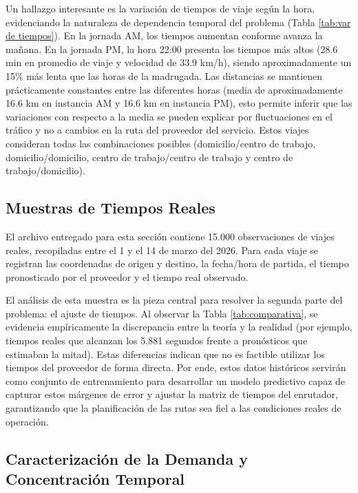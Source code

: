 Un hallazgo interesante es la variación de tiempos de viaje según la hora, evidenciando la naturaleza de dependencia temporal del problema (Tabla \ref{tab:var de tiempos}). En la jornada AM, los tiempos aumentan conforme avanza la mañana. En la jornada PM, la hora 22:00 presenta los tiempos más altos (28.6 min en promedio de viaje y velocidad de 33.9 km/h), siendo aproximadamente un 15\% más lenta que las horas de la madrugada. Las distancias se mantienen prácticamente constantes entre las diferentes horas (media de aproximadamente 16.6 km en instancia AM y 16.6 km en instancia PM), esto permite inferir que las variaciones con respecto a la media se pueden explicar por fluctuaciones en el tráfico y no a cambios en la ruta del proveedor del servicio. Estos viajes consideran todas las combinaciones posibles (domicilio/centro de trabajo, domicilio/domicilio, centro de trabajo/centro de trabajo y centro de trabajo/domicilio).



\subsection{Muestras de Tiempos Reales}

El archivo entregado para esta sección contiene 15.000 observaciones de viajes reales, recopiladas entre el 1 y el 14 de marzo del 2026. Para cada viaje se registran las coordenadas de origen y destino, la fecha/hora de partida, el tiempo pronosticado por el proveedor y el tiempo real observado.

El análisis de esta muestra es la pieza central para resolver la segunda parte del problema: el ajuste de tiempos. Al observar la Tabla \ref{tab:comparativa}, se evidencia empíricamente la discrepancia entre la teoría y la realidad (por ejemplo, tiempos reales que alcanzan los 5.881 segundos frente a pronósticos que estimaban la mitad). Estas diferencias indican que no es factible utilizar los tiempos del proveedor de forma directa. Por ende, estos datos históricos servirán como conjunto de entrenamiento para desarrollar un modelo predictivo capaz de capturar estos márgenes de error y ajustar la matriz de tiempos del enrutador, garantizando que la planificación de las rutas sea fiel a las condiciones reales de operación.

\subsection{Caracterización de la Demanda y Concentración Temporal}


